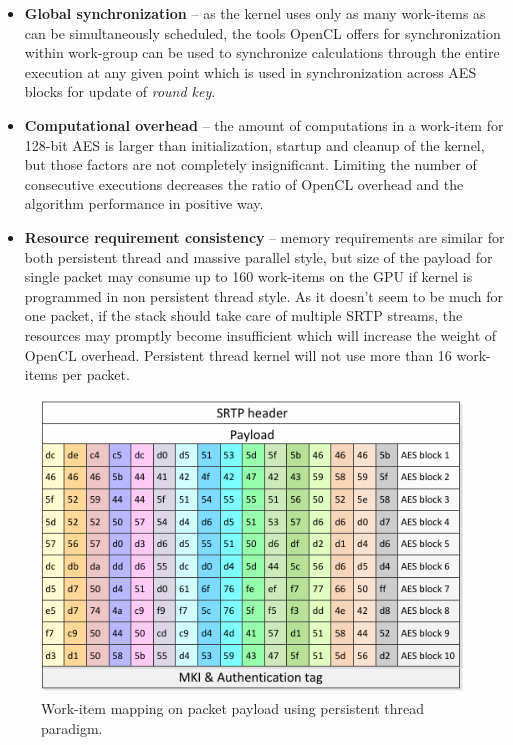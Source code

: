 \begin{itemize}
\item \textbf{Global synchronization} -- as the kernel uses only as many 
work-items as can be simultaneously scheduled, the tools OpenCL offers
for synchronization within work-group can be used to synchronize calculations
through the entire execution at any given point which is used in 
synchronization across AES blocks for update of \textit{round key}.
\item \textbf{Computational overhead} -- the amount of computations in a 
work-item for 128-bit AES is larger than initialization, startup and cleanup
of the kernel, but those factors are not completely insignificant. Limiting
the number of consecutive executions decreases the ratio of OpenCL overhead and
the algorithm performance in positive way.
\item \textbf{Resource requirement consistency} -- memory requirements are
similar for both persistent thread and massive parallel style, but size of the 
payload for single packet may consume up to 160 work-items on the GPU if kernel
is programmed in non persistent thread style. As it doesn't seem to be much for
one packet, if the stack should take care of multiple SRTP streams, the 
resources may promptly become insufficient which will increase the weight of 
OpenCL overhead. Persistent thread kernel will not use more than 16 work-items
per packet.
\end{itemize}

\begin{figure}[H]
\centering
\includegraphics[width=12cm]{fig/packet_wi.pdf}
\caption[Persistent thread work-item mapping]{Work-item mapping on packet 
payload using persistent thread paradigm.}
\label{pt_payload}
\end{figure}


